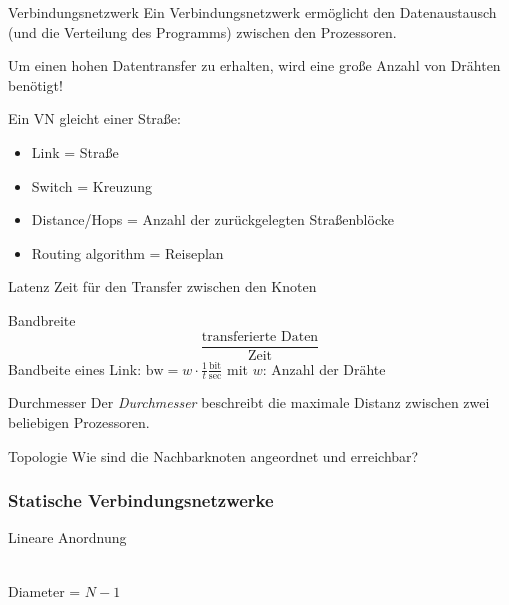 \begin{defi}{Verbindungsnetzwerk}
    Ein Verbindungsnetzwerk ermöglicht den Datenaustausch (und die Verteilung des Programms) zwischen den Prozessoren.
    
    Um einen hohen Datentransfer zu erhalten, 
    wird eine große Anzahl von Drähten benötigt!
    
    Ein VN gleicht einer Straße:
    \begin{itemize}
        \item Link = Straße
        \item Switch = Kreuzung
        \item Distance/Hops = Anzahl der zurückgelegten Straßenblöcke
        \item Routing algorithm = Reiseplan
    \end{itemize}
    
\end{defi}

\begin{defi}[Verbindungsnetzwerk]{Latenz}
    Zeit für den Transfer zwischen den Knoten
\end{defi}

\begin{defi}[Verbindungsnetzwerk]{Bandbreite}
    \[\frac{\text{transferierte Daten}}{\text{Zeit}}\]
    Bandbeite eines Link: $\text{bw} = w \cdot \frac{1}{t}\frac{\text{bit}}{\text{sec}}$
    mit $w$: Anzahl der Drähte
\end{defi}

\begin{defi}[Verbindungsnetzwerk]{Durchmesser}
    Der \emph{Durchmesser} beschreibt die maximale Distanz zwischen zwei beliebigen Prozessoren.
\end{defi}

\begin{defi}[Verbindungsnetzwerk]{Topologie}
    Wie sind die Nachbarknoten angeordnet und erreichbar?
\end{defi}

\subsubsection{Statische Verbindungsnetzwerke}

\begin{defi}{Lineare Anordnung}
    \begin{center}
        \\
        Diameter = $N-1$
    \end{center}
\end{defi}


